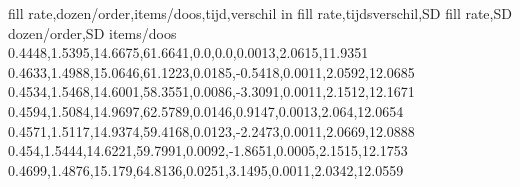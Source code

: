 fill rate,dozen/order,items/doos,tijd,verschil in fill rate,tijdsverschil,SD fill rate,SD dozen/order,SD items/doos
0.4448,1.5395,14.6675,61.6641,0.0,0.0,0.0013,2.0615,11.9351
0.4633,1.4988,15.0646,61.1223,0.0185,-0.5418,0.0011,2.0592,12.0685
0.4534,1.5468,14.6001,58.3551,0.0086,-3.3091,0.0011,2.1512,12.1671
0.4594,1.5084,14.9697,62.5789,0.0146,0.9147,0.0013,2.064,12.0654
0.4571,1.5117,14.9374,59.4168,0.0123,-2.2473,0.0011,2.0669,12.0888
0.454,1.5444,14.6221,59.7991,0.0092,-1.8651,0.0005,2.1515,12.1753
0.4699,1.4876,15.179,64.8136,0.0251,3.1495,0.0011,2.0342,12.0559
